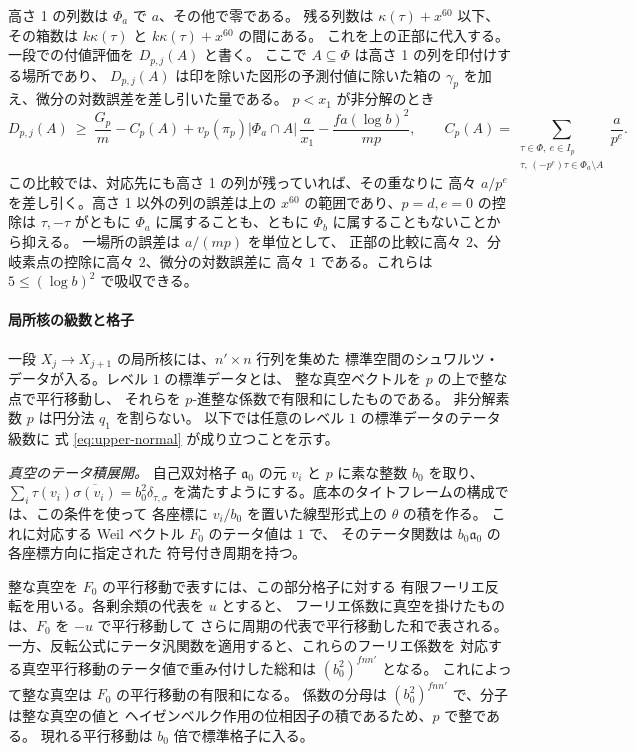 高さ 1 の列数は \(\Phi_a\) で \(a\)、その他で零である。
残る列数は \(\kappa(\tau)+x^{60}\) 以下、その箱数は
\(k\kappa(\tau)\) と \(k\kappa(\tau)+x^{60}\) の間にある。
これを上の正部に代入する。一段での付値評価を \(D_{p,j}(A)\) と書く。
ここで \(A\subseteq\Phi\) は高さ 1 の列を印付けする場所であり、
\(D_{p,j}(A)\) は印を除いた図形の予測付値に除いた箱の
\(\gamma_p\) を加え、微分の対数誤差を差し引いた量である。
\(p<x_1\) が非分解のとき
\begin{equation}\label{eq:upper-one-step}
 D_{p,j}(A)\ \ge\ \frac{G_p}{m}
  - C_p(A)
  +v_p(\pi_p)|\Phi_a\cap A|\,\frac{a}{x_1}
  -\frac{fa(\log b)^2}{mp},
 \qquad
 C_p(A)=\sum_{\substack{\tau\in\Phi,\ e\in I_p\\
                 \tau,\,(-p^e)\tau\in\Phi_a\setminus A}}\frac{a}{p^e}.
\end{equation}
この比較では、対応先にも高さ 1 の列が残っていれば、その重なりに
高々 \(a/p^e\) を差し引く。高さ 1 以外の列の誤差は上の \(x^{60}\)
の範囲であり、\(p=d,e=0\) の控除は \(\tau,-\tau\) がともに
\(\Phi_a\) に属することも、ともに \(\Phi_b\) に属することもないことから抑える。
一場所の誤差は \(a/(mp)\) を単位として、
正部の比較に高々 \(2\)、分岐素点の控除に高々 \(2\)、微分の対数誤差に
高々 \(1\) である。これらは \(5\le(\log b)^2\) で吸収できる。

\paragraph{局所核の級数と格子}
一段 \(X_j\to X_{j+1}\) の局所核には、\(n'\times n\) 行列を集めた
標準空間のシュワルツ・データが入る。レベル \(1\) の標準データとは、
整な真空ベクトルを \(p\) の上で整な点で平行移動し、
それらを \(p\)-進整な係数で有限和にしたものである。
非分解素数 \(p\) は円分法 \(q_1\) を割らない。
以下では任意のレベル \(1\) の標準データのテータ級数に
式 \eqref{eq:upper-normal} が成り立つことを示す。

\emph{真空のテータ積展開。}
自己双対格子 \(\mathfrak a_0\) の元 \(v_i\) と \(p\) に素な整数 \(b_0\) を取り、
\(\sum_i \tau(v_i)\overline{\sigma(v_i)}=b_0^2\delta_{\tau,\sigma}\)
を満たすようにする。底本のタイトフレームの構成では、この条件を使って
各座標に \(v_i/b_0\) を置いた線型形式上の \(\theta\) の積を作る。
これに対応する Weil ベクトル \(F_0\) のテータ値は \(1\) で、
そのテータ関数は \(b_0\mathfrak a_0\) の各座標方向に指定された
符号付き周期を持つ。

整な真空を \(F_0\) の平行移動で表すには、この部分格子に対する
有限フーリエ反転を用いる。各剰余類の代表を \(u\) とすると、
フーリエ係数に真空を掛けたものは、\(F_0\) を \(-u\) で平行移動して
さらに周期の代表で平行移動した和で表される。
一方、反転公式にテータ汎関数を適用すると、これらのフーリエ係数を
対応する真空平行移動のテータ値で重み付けした総和は
\((b_0^2)^{f n n'}\) となる。
これによって整な真空は \(F_0\) の平行移動の有限和になる。
係数の分母は \((b_0^2)^{f n n'}\) で、分子は整な真空の値と
ヘイゼンベルク作用の位相因子の積であるため、\(p\) で整である。
現れる平行移動は \(b_0\) 倍で標準格子に入る。

